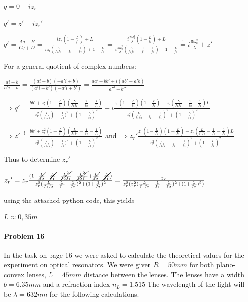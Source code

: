 \documentclass{article}
\newcommand{\mbeq}{\overset{!}{=}}
\begin{document}
\setlength{\parskip}{2em}

$
q=0+iz_r$\par$
{q}'={z}'+i{z_r}'
$

${q}'=\frac{Aq+B}{Cq+D}=\frac{iz_r(1-\frac{L}{f_1})+L}{iz_r(\frac{L}{f_1 f_2}-\frac{1}{f_1}-\frac{1}{f_2})+1-\frac{L}{f_2}}=\frac{i\frac{\pi\omega_0^2}{\lambda}(1-\frac{L}{f_1})+L}{i\frac{\pi\omega_0^2}{\lambda}(\frac{L}{f_1 f_2}-\frac{1}{f_1}-\frac{1}{f_2})+1-\frac{L}{f_2}}\mbeq i\frac{\pi\omega_0^2}{\lambda}+{z}'$ 


For a general quotient of complex numbers:

$\frac{ai+b}{{a}'i+{b}'}=\frac{(ai+b)(-{a}'i+b)}{({a}'i+{b}')(-{a}'i+{b}')}=\frac{a{a}'+b{b}'+i(a{b}'-{a}'b)}{{a}'^2+{b}'^2}
$

$\Rightarrow{} {q}' = \frac{b{b}'+z_r^2(1-\frac{L}{f_1})(\frac{L}{f_1 f_2}-\frac{1}{f_2}-\frac{1}{f_1})}{z_r^2(\frac{L}{f_1 f_2})-\frac{1}{f_2})^2+(1-\frac{L}{f_2})^2}+i\frac{z_r(1-\frac{L}{f_1})(1-\frac{L}{f_2})-z_r(\frac{L}{f_1 f_2}-\frac{1}{f_2}-\frac{1}{f_1})L}{z_r^2(\frac{L}{f_1 f_2}-\frac{1}{f_2}-\frac{1}{f_1})^2+(1-\frac{L}{f_2})^2}
$

$\Rightarrow{} {z}'\mbeq \frac{b{b}'+z_r^2(1-\frac{L}{f_1})(\frac{L}{f_1 f_2}-\frac{1}{f_2}-\frac{1}{f_1})}{z_r^2(\frac{L}{f_1 f_2})-\frac{1}{f_2})^2+(1-\frac{L}{f_2})^2} $
 and
 $\Rightarrow{}{} {z_r}' \frac{z_r(1-\frac{L}{f_1})(1-\frac{L}{f_2})-z_r(\frac{L}{f_1 f_2}-\frac{1}{f_2}-\frac{1}{f_1})L}{z_r^2(\frac{L}{f_1 f_2}-\frac{1}{f_2}-\frac{1}{f_1})^2+(1-\frac{L}{f_2})^2}$
 
 Thus to determine ${z_r}'$
 
 ${z_r}'=z_r\frac{(1-\cancel{\frac{L}{f_2}}-\cancel{\frac{L}{f_1}}+\cancel{\frac{L^2}{f_2 f_1}}-\cancel{\frac{L^2}{f_2 f_1}}+\cancel{\frac{L}{f_2}}+\cancel{\frac{L}{f_1}})}{z_r^2(\frac{L}{f_1 f_2}-\frac{1}{f_1}-\frac{1}{f_2})^2+(1+\frac{1}{f_2})^2}=\frac{z_r}{z_r^2(z_r^2(\frac{L}{f_1 f_2}-\frac{1}{f_1}-\frac{1}{f_2})^2+(1+\frac{1}{f_2})^2)} 
 $
 
 using the attached python code, this yields
 
 $L \approx 0,35 m$


\paragraph{Problem 16}

 In the task on page 16 we were asked to calculate the theoretical values for the experiment on optical resonators. We were given $R=50mm$ for both plano-convex lenses, $L=45mm$ distance between the lenses. The lenses have a width $b=6.35mm$ and a refraction index $n_{L} = 1.515$ The wavelength of the light will be $\lambda = 632nm$ for the following calculations.\\
\\
\end{document}
